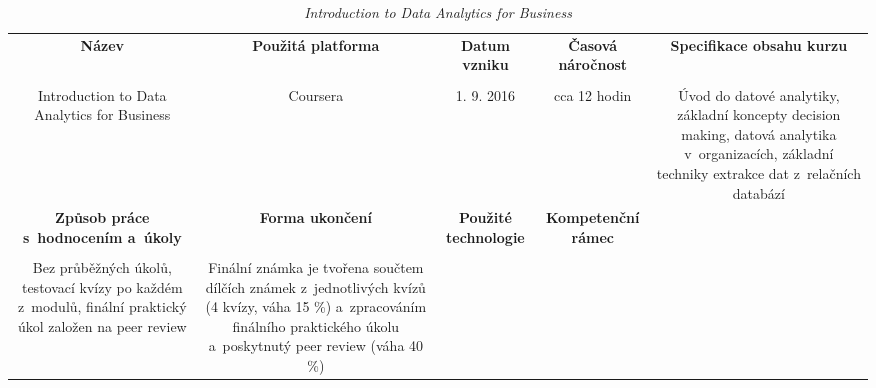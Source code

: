 \begin{landscape}

\begin{table}[htbp]

\renewcommand\thetable{1}

\caption{\textit{Introduction to Data Analytics for Business}}\label{tab1}

\footnotesize

{

\justifying

\begin{tabularx}{\linewidth}{CCCCC}

\toprule

\textbf{Název} &

\textbf{Použitá platforma} &

\textbf{Datum vzniku} &

\textbf{Časová náročnost} &
 
\textbf{Specifikace obsahu kurzu}

\\

\tabularnewline
\midrule

Introduction to Data Analytics for Business

&

Coursera

&

1. 9. 2016

&

cca 12 hodin

&

Úvod do datové analytiky, základní koncepty decision making, datová analytika v~organizacích, základní techniky extrakce dat z~relačních databází

\\
\toprule

\textbf{Způsob práce s~hodnocením a~úkoly} &

\textbf{Forma ukončení} &

\textbf{Použité technologie} &

\textbf{Kompetenční rámec} 

\\

\tabularnewline
\midrule

Bez průběžných úkolů, testovací kvízy po každém z~modulů, finální praktický úkol založen na peer review

&

Finální známka je tvořena součtem dílčích známek z~jednotlivých kvízů (4 kvízy, váha 15 \%) a~zpracováním finálního praktického úkolu a~poskytnutý peer review (váha 40 \%)


\end{tabularx}}
\end{table}
\end{landscape}

